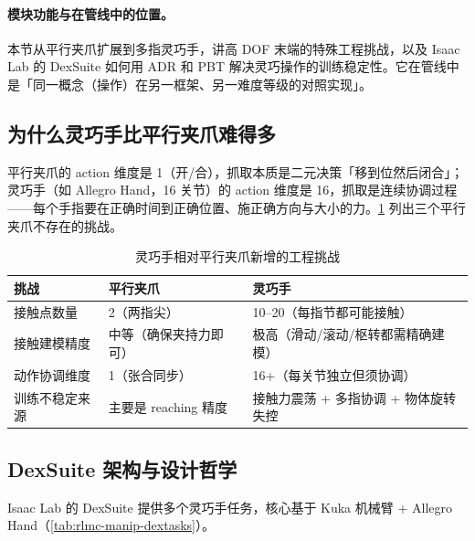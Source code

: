\paragraph{模块功能与在管线中的位置。}本节从平行夹爪扩展到多指灵巧手，讲高 DOF 末端的特殊工程挑战，以及 Isaac Lab 的 DexSuite 如何用 ADR 和 PBT 解决灵巧操作的训练稳定性。它在管线中是「同一概念（操作）在另一框架、另一难度等级的对照实现」。

\subsection{为什么灵巧手比平行夹爪难得多}
\label{sec:rlmc-manip-dexhard}

平行夹爪的 action 维度是 1（开/合），抓取本质是二元决策「移到位然后闭合」；灵巧手（如 Allegro Hand，16 关节）的 action 维度是 16，抓取是连续协调过程——每个手指要在正确时间到正确位置、施正确方向与大小的力。\cref{tab:rlmc-manip-dexchallenge} 列出三个平行夹爪不存在的挑战。

\begin{table}[ht]
\centering
\small
\caption{灵巧手相对平行夹爪新增的工程挑战}
\label{tab:rlmc-manip-dexchallenge}
\begin{tabular}{@{}lll@{}}
\toprule
挑战 & 平行夹爪 & 灵巧手 \\
\midrule
接触点数量 & 2（两指尖） & 10--20（每指节都可能接触） \\
接触建模精度 & 中等（确保夹持力即可） & 极高（滑动/滚动/枢转都需精确建模） \\
动作协调维度 & 1（张合同步） & 16+（每关节独立但须协调） \\
训练不稳定来源 & 主要是 reaching 精度 & 接触力震荡 + 多指协调 + 物体旋转失控 \\
\bottomrule
\end{tabular}
\end{table}

\subsection{DexSuite 架构与设计哲学}
\label{sec:rlmc-manip-dexsuite}

Isaac Lab 的 DexSuite 提供多个灵巧手任务，核心基于 Kuka 机械臂 + Allegro Hand（\cref{tab:rlmc-manip-dextasks}）。

